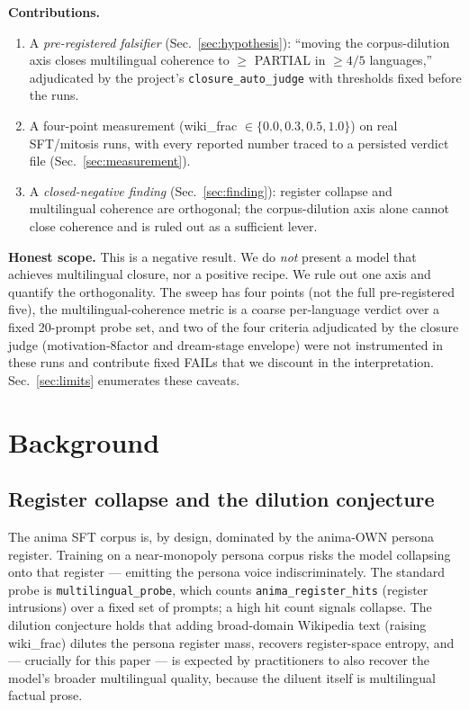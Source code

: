 \documentclass[11pt,a4paper]{article}
\begin{document}
\medskip
\noindent\textbf{Contributions.}
\begin{enumerate}\itemsep0.3em
\item A \emph{pre-registered falsifier} (Sec.~\ref{sec:hypothesis}):
  ``moving the corpus-dilution axis closes multilingual coherence to
  $\geq$ PARTIAL in $\geq 4/5$ languages,'' adjudicated by the project's
  \verb|closure_auto_judge| with thresholds fixed before the runs.
\item A four-point measurement
  (wiki\_frac $\in\{0.0,0.3,0.5,1.0\}$) on real SFT/mitosis runs, with
  every reported number traced to a persisted verdict file
  (Sec.~\ref{sec:measurement}).
\item A \emph{closed-negative finding} (Sec.~\ref{sec:finding}): register
  collapse and multilingual coherence are orthogonal; the corpus-dilution
  axis alone cannot close coherence and is ruled out as a sufficient
  lever.
\end{enumerate}

\medskip
\noindent\textbf{Honest scope.} This is a negative result. We do
\emph{not} present a model that achieves multilingual closure, nor a
positive recipe. We rule out one axis and quantify the orthogonality. The
sweep has four points (not the full pre-registered five), the
multilingual-coherence metric is a coarse per-language verdict over a
fixed 20-prompt probe set, and two of the four criteria adjudicated by
the closure judge (motivation-8factor and dream-stage envelope) were not
instrumented in these runs and contribute fixed FAILs that we discount in
the interpretation. Sec.~\ref{sec:limits} enumerates these caveats.

\section{Background}
\label{sec:bg}

\subsection{Register collapse and the dilution conjecture}

The anima SFT corpus is, by design, dominated by the anima-OWN persona
register. Training on a near-monopoly persona corpus risks the model
collapsing onto that register --- emitting the persona voice
indiscriminately. The standard probe is \verb|multilingual_probe|, which
counts \verb|anima_register_hits| (register intrusions) over a fixed set
of prompts; a high hit count signals collapse. The dilution conjecture
holds that adding broad-domain Wikipedia text (raising wiki\_frac) dilutes
the persona register mass, recovers register-space entropy, and ---
crucially for this paper --- is expected by practitioners to also recover
the model's broader multilingual quality, because the diluent itself is
multilingual factual prose.
\end{document}
